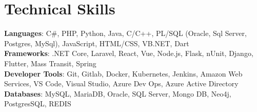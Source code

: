 \documentclass[letterpaper,11pt]{article}
\makeatletter
\newcommand{\resumeItem}[1]{
  \item\small{
    {#1 \vspace{-2pt}}
  }
}
\newcommand{\resumeProjectHeading}[2]{
    \item
    \begin{tabular*}{0.97\textwidth}{l@{\extracolsep{\fill}}r}
      \small#1 & #2 \\
    \end{tabular*}\vspace{-7pt}
}
\newcommand{\resumeSubHeadingListStart}{\begin{itemize}[leftmargin=0.15in, label={}]}
\newcommand{\resumeSubHeadingListEnd}{\end{itemize}}
\newcommand{\resumeItemListStart}{\begin{itemize}}
\newcommand{\resumeItemListEnd}{\end{itemize}\vspace{-5pt}}
\makeatother
\begin{document}


%
\section{Technical Skills}
 \begin{itemize}[leftmargin=0.15in, label={}]
    \small{\item{
     \textbf{Languages}{: C\#, PHP, Python, Java, C/C++, PL/SQL (Oracle, Sql Server, Postgres, MySql), JavaScript, HTML/CSS, VB.NET, Dart} \\
     \textbf{Frameworks}{: .NET Core, Laravel, React, Vue, Node.js, Flask, nUnit, Django, Flutter, Mass Transit, Spring} \\
     \textbf{Developer Tools}{: Git, Gitlab, Docker, Kubernetes, Jenkins, Amazon Web Services, VS Code, Visual Studio, Azure Dev Ops, Azure Active Directory} \\
     \textbf{Databases}{: MySQL, MariaDB, Oracle, SQL Server, Mongo DB, Neo4j, PostgresSQL, REDIS} \\
    }}
 \end{itemize}


\end{document}
